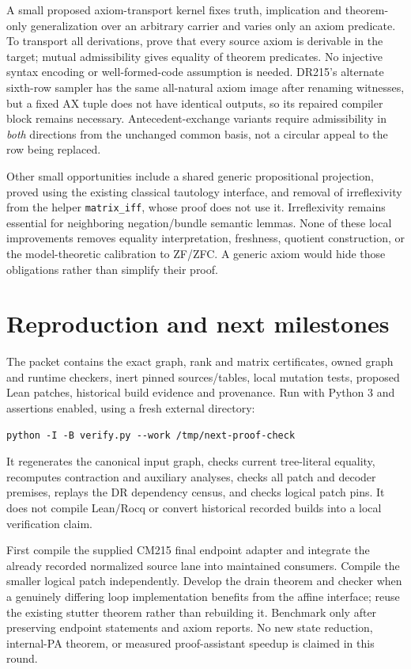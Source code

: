 \documentclass[11pt]{article}
\begin{document}
A small proposed axiom-transport kernel fixes truth, implication and theorem-only generalization over an arbitrary carrier and varies only an axiom predicate. To transport all derivations, prove that every source axiom is derivable in the target; mutual admissibility gives equality of theorem predicates. No injective syntax encoding or well-formed-code assumption is needed. DR215's alternate sixth-row sampler has the same all-natural axiom image after renaming witnesses, but a fixed AX tuple does not have identical outputs, so its repaired compiler block remains necessary. Antecedent-exchange variants require admissibility in \emph{both} directions from the unchanged common basis, not a circular appeal to the row being replaced.

Other small opportunities include a shared generic propositional projection, proved using the existing classical tautology interface, and removal of irreflexivity from the helper \texttt{matrix\_iff}, whose proof does not use it. Irreflexivity remains essential for neighboring negation/bundle semantic lemmas. None of these local improvements removes equality interpretation, freshness, quotient construction, or the model-theoretic calibration to ZF/ZFC. A generic axiom would hide those obligations rather than simplify their proof.

\section{Reproduction and next milestones}
The packet contains the exact graph, rank and matrix certificates, owned graph and runtime checkers, inert pinned sources/tables, local mutation tests, proposed Lean patches, historical build evidence and provenance. Run with Python 3 and assertions enabled, using a fresh external directory:
\begin{verbatim}
python -I -B verify.py --work /tmp/next-proof-check
\end{verbatim}
It regenerates the canonical input graph, checks current tree-literal equality, recomputes contraction and auxiliary analyses, checks all patch and decoder premises, replays the DR dependency census, and checks logical patch pins. It does not compile Lean/Rocq or convert historical recorded builds into a local verification claim.

First compile the supplied CM215 final endpoint adapter and integrate the already recorded normalized source lane into maintained consumers. Compile the smaller logical patch independently. Develop the drain theorem and checker when a genuinely differing loop implementation benefits from the affine interface; reuse the existing stutter theorem rather than rebuilding it. Benchmark only after preserving endpoint statements and axiom reports. No new state reduction, internal-PA theorem, or measured proof-assistant speedup is claimed in this round.
\end{document}
